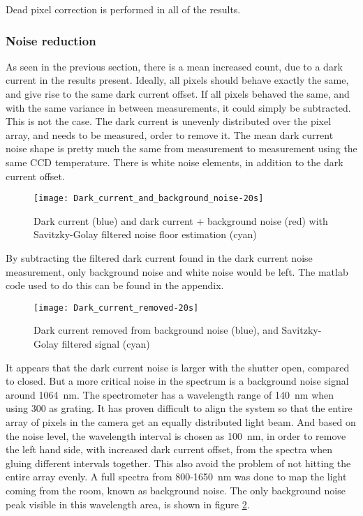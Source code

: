 Dead pixel correction is performed in all of the results.

\subsubsection{Noise reduction}

As seen in the previous section, there is a mean increased count, due to a dark current in the results present. Ideally, all pixels should behave exactly the same, and give rise to the same dark current offset. If all pixels behaved the same, and with the same variance in between measurements, it could simply be subtracted. This is not the case. The dark current is unevenly distributed over the pixel array, and needs to be measured, order to remove it. The mean dark current noise shape is pretty much the same from measurement to measurement using the same CCD temperature. There is white noise elements, in addition to the dark current offset. 

\begin{figure}[H]
\centering
\texttt{[image: Dark\_current\_and\_background\_noise-20s]}
\caption[Dark current and noise]{Dark current (blue) and dark current + background noise (red) with Savitzky-Golay filtered noise floor estimation (cyan)}%
\label{fig:dark_current_and_background_noise}%
\end{figure}

By subtracting the filtered dark current found in the dark current noise measurement, only background noise and white noise would be left. The matlab code used to do this can be found in the appendix.

\begin{figure}[H]
\centering
\texttt{[image: Dark\_current\_removed-20s]}
\caption[Dark current removed]{Dark current removed from background noise (blue), and Savitzky-Golay filtered signal (cyan)}%
\label{fig:dark_current_removed-20s}%
\end{figure}

It appears that the dark current noise is larger with the shutter open, compared to closed. But a more critical noise in the spectrum is a background noise signal around 1064~nm. The spectrometer has a wavelength range of 140~nm when using 300 as grating. It has proven difficult to align the system so that the entire array of pixels in the camera get an equally distributed light beam. And based on the noise level, the wavelength interval is chosen as 100~nm, in order to remove the left hand side, with increased dark current offset, from the spectra when gluing different intervals together. This also avoid the problem of not hitting the entire array evenly. A full spectra from 800-1650~nm was done to map the light coming from the room, known as background noise. The only background noise peak visible in this wavelength area, is shown in figure \ref{fig:dark_current_removed-20s}.

